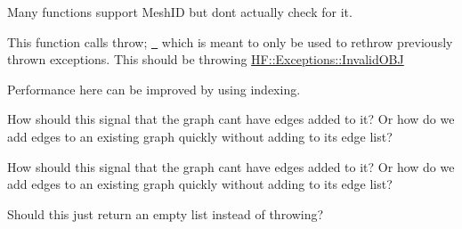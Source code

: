\begin{DoxyRefList}
%
Many functions support Mesh\+ID but don\textquotesingle{}t actually check for it.  
\item[Member \mbox{\hyperlink{a01357_a77b7c9be7bef56688f3e7877378d05c7}{HF::Ray\+Tracer::Embree\+Ray\+Tracer::Embree\+Ray\+Tracer}} (std\+::vector$<$ \mbox{\hyperlink{a00403_a4f0c57b862a0826821217d8c3ac849c4}{H\+F\+::\+Geometry\+::\+Mesh\+Info$<$ float $>$}}$>$ \&MI, bool use\+\_\+precise\+\_\+intersection=false)]\label{a00386__todo000023}%
%
This function calls {\ttfamily  throw; } \href{https://en.cppreference.com/w/cpp/language/throw}{\texttt{ }} which is meant to only be used to rethrow previously thrown exceptions. This should be throwing \mbox{\hyperlink{a01269}{H\+F\+::\+Exceptions\+::\+Invalid\+O\+BJ}}  
\item[Member \mbox{\hyperlink{a00398_a9a8051c9b70fc0ae60337d4a38bf5f57}{HF::Ray\+Tracer::vectors\+To\+Buffers}} (const std\+::vector$<$ std\+::array$<$ float, 3 $>$$>$ \&vertices, std\+::vector$<$ Triangle $>$ \&Tribuffer, std\+::vector$<$ Vertex $>$ \&Vbuffer)]\label{a00386__todo000020}%
%
Performance here can be improved by using indexing.  
\item[Member \mbox{\hyperlink{a01497_a37be5c12e488072dea7fa1c8c64346f7}{HF::Spatial\+Structures::Graph::add\+Edge}} (const \mbox{\hyperlink{a02017}{Node}} \&parent, const \mbox{\hyperlink{a02017}{Node}} \&child, float score=1.\+0f, const std\+::string \&cost\+\_\+type=\char`\"{}\char`\"{})]\label{a00386__todo000026}%
%
How should this signal that the graph can\textquotesingle{}t have edges added to it? Or how do we add edges to an existing graph quickly without adding to its edge list? 
\item[Member \mbox{\hyperlink{a01497_a0584ab845d5c21979b1542651a4cf3aa}{HF::Spatial\+Structures::Graph::add\+Edge}} (int parent\+\_\+id, int child\+\_\+id, float score, const std\+::string \&cost\+\_\+type=\char`\"{}\char`\"{})]\label{a00386__todo000027}%
%
How should this signal that the graph can\textquotesingle{}t have edges added to it? Or how do we add edges to an existing graph quickly without adding to its edge list? 
\item[Member \mbox{\hyperlink{a01497_a1aaa9ac6c84a3ca837963369d6c49876}{HF::Spatial\+Structures::Graph::operator\mbox{[}\mbox{]}}} (const \mbox{\hyperlink{a02017}{Node}} \&n) const]\label{a00386__todo000025}%
%
Should this just return an empty list instead of throwing?  
$$
\end{DoxyRefList}
